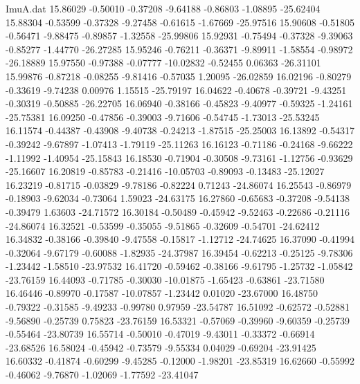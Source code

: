 \begin{filecontents}{ImuA.dat}
  15.86029   -0.50010   -0.37208   -9.64188   -0.86803   -1.08895  -25.62404
  15.88304   -0.53599   -0.37328   -9.27458   -0.61615   -1.67669  -25.97516
  15.90608   -0.51805   -0.56471   -9.88475   -0.89857   -1.32558  -25.99806
  15.92931   -0.75494   -0.37328   -9.39063   -0.85277   -1.44770  -26.27285
  15.95246   -0.76211   -0.36371   -9.89911   -1.58554   -0.98972  -26.18889
  15.97550   -0.97388   -0.07777  -10.02832   -0.52455    0.06363  -26.31101
  15.99876   -0.87218   -0.08255   -9.81416   -0.57035    1.20095  -26.02859
  16.02196   -0.80279   -0.33619   -9.74238    0.00976    1.15515  -25.79197
  16.04622   -0.40678   -0.39721   -9.43251   -0.30319   -0.50885  -26.22705
  16.06940   -0.38166   -0.45823   -9.40977   -0.59325   -1.24161  -25.75381
  16.09250   -0.47856   -0.39003   -9.71606   -0.54745   -1.73013  -25.53245
  16.11574   -0.44387   -0.43908   -9.40738   -0.24213   -1.87515  -25.25003
  16.13892   -0.54317   -0.39242   -9.67897   -1.07413   -1.79119  -25.11263
  16.16123   -0.71186   -0.24168   -9.66222   -1.11992   -1.40954  -25.15843
  16.18530   -0.71904   -0.30508   -9.73161   -1.12756   -0.93629  -25.16607
  16.20819   -0.85783   -0.21416  -10.05703   -0.89093   -0.13483  -25.12027
  16.23219   -0.81715   -0.03829   -9.78186   -0.82224    0.71243  -24.86074
  16.25543   -0.86979   -0.18903   -9.62034   -0.73064    1.59023  -24.63175
  16.27860   -0.65683   -0.37208   -9.54138   -0.39479    1.63603  -24.71572
  16.30184   -0.50489   -0.45942   -9.52463   -0.22686   -0.21116  -24.86074
  16.32521   -0.53599   -0.35055   -9.51865   -0.32609   -0.54701  -24.62412
  16.34832   -0.38166   -0.39840   -9.47558   -0.15817   -1.12712  -24.74625
  16.37090   -0.41994   -0.32064   -9.67179   -0.60088   -1.82935  -24.37987
  16.39454   -0.62213   -0.25125   -9.78306   -1.23442   -1.58510  -23.97532
  16.41720   -0.59462   -0.38166   -9.61795   -1.25732   -1.05842  -23.76159
  16.44093   -0.71785   -0.30030  -10.01875   -1.65423   -0.63861  -23.71580
  16.46446   -0.89970   -0.17587  -10.07857   -1.23442    0.01020  -23.67000
  16.48750   -0.79322   -0.31585   -9.49233   -0.99780    0.97959  -23.54787
  16.51092   -0.62572   -0.52881   -9.56890   -0.25739    0.75823  -23.76159
  16.53321   -0.57069   -0.39960   -9.60359   -0.25739   -0.55464  -23.80739
  16.55714   -0.50010   -0.47019   -9.43011   -0.33372   -0.66914  -23.68526
  16.58024   -0.45942   -0.73579   -9.55334    0.04029   -0.69204  -23.91425
  16.60332   -0.41874   -0.60299   -9.45285   -0.12000   -1.98201  -23.85319
  16.62660   -0.55992   -0.46062   -9.76870   -1.02069   -1.77592  -23.41047

\end{filecontents}
